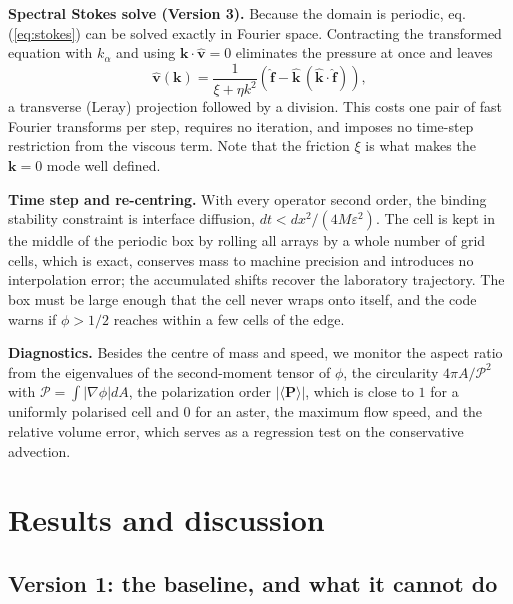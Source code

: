 \documentclass[11pt]{article}
\begin{document}
\textbf{Spectral Stokes solve (Version 3).} Because the domain is periodic,
eq.(\ref{eq:stokes}) can be solved exactly in Fourier space. Contracting the
transformed equation with $k_\alpha$ and using
$\mathbf{k}\cdot\hat{\mathbf{v}}=0$ eliminates the pressure at once and leaves
\begin{equation}\label{eq:leray}
\hat{\mathbf{v}}(\mathbf{k})=\frac{1}{\xi+\eta k^{2}}
\left(\hat{\mathbf{f}}-\hat{\mathbf{k}}\,
(\hat{\mathbf{k}}\cdot\hat{\mathbf{f}})\right),
\end{equation}
a transverse (Leray) projection followed by a division. This costs one pair of
fast Fourier transforms per step, requires no iteration, and imposes no
time-step restriction from the viscous term. Note that the friction $\xi$ is what
makes the $\mathbf{k}=0$ mode well defined.

\textbf{Time step and re-centring.} With every operator second order, the binding
stability constraint is interface diffusion, $dt<dx^{2}/(4M\varepsilon^{2})$. The
cell is kept in the middle of the periodic box by rolling all arrays by a whole
number of grid cells, which is exact, conserves mass to machine precision and
introduces no interpolation error; the accumulated shifts recover the laboratory
trajectory. The box must be large enough that the cell never wraps onto itself,
and the code warns if $\phi>1/2$ reaches within a few cells of the edge.

\textbf{Diagnostics.} Besides the centre of mass and speed, we monitor the aspect
ratio from the eigenvalues of the second-moment tensor of $\phi$, the circularity
$4\pi A/\mathcal{P}^{2}$ with $\mathcal{P}=\int|\nabla\phi|dA$, the polarization
order $|\langle\mathbf{P}\rangle|$, which is close to $1$ for a uniformly
polarised cell and $0$ for an aster, the maximum flow speed, and the relative
volume error, which serves as a regression test on the conservative advection.

\section{Results and discussion}
\label{sec:results}

\subsection{Version 1: the baseline, and what it cannot do}
\label{sec:v1}
\end{document}
